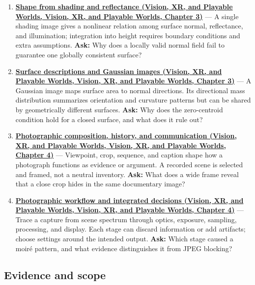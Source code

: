 \begin{enumerate}
\item
  \textbf{\href{../07-Vision-XR-and-Playable-Worlds/main.pdf\#nameddest=04-visual-computing-ii-ch032-shape-from-shading-and-reflectance}{Shape from shading and reflectance (Vision, XR, and Playable Worlds, Vision, XR, and Playable Worlds, Chapter 3)}} --- A single shading image gives a nonlinear relation among surface normal, reflectance, and illumination; integration into height requires boundary conditions and extra assumptions. \textbf{Ask:} Why does a locally valid normal field fail to guarantee one globally consistent surface?
\item
  \textbf{\href{../07-Vision-XR-and-Playable-Worlds/main.pdf\#nameddest=04-visual-computing-ii-ch032-surface-descriptions-and-gaussian-images}{Surface descriptions and Gaussian images (Vision, XR, and Playable Worlds, Vision, XR, and Playable Worlds, Chapter 3)}} --- A Gaussian image maps surface area to normal directions. Its directional mass distribution summarizes orientation and curvature patterns but can be shared by geometrically different surfaces. \textbf{Ask:} Why does the zero-centroid condition hold for a closed surface, and what does it rule out?
\item
  \textbf{\href{../07-Vision-XR-and-Playable-Worlds/main.pdf\#nameddest=04-visual-computing-ii-ch034-photographic-composition-history-and-communication}{Photographic composition, history, and communication (Vision, XR, and Playable Worlds, Vision, XR, and Playable Worlds, Chapter 4)}} --- Viewpoint, crop, sequence, and caption shape how a photograph functions as evidence or argument. A recorded scene is selected and framed, not a neutral inventory. \textbf{Ask:} What does a wide frame reveal that a close crop hides in the same documentary image?
\item
  \textbf{\href{../07-Vision-XR-and-Playable-Worlds/main.pdf\#nameddest=04-visual-computing-ii-ch034-photographic-workflow-and-integrated-decisions}{Photographic workflow and integrated decisions (Vision, XR, and Playable Worlds, Vision, XR, and Playable Worlds, Chapter 4)}} --- Trace a capture from scene spectrum through optics, exposure, sampling, processing, and display. Each stage can discard information or add artifacts; choose settings around the intended output. \textbf{Ask:} Which stage caused a moiré pattern, and what evidence distinguishes it from JPEG blocking?
\end{enumerate}

\subsection{Evidence and scope}\label{appendix-a8f634b076b5-evidence-and-scope}

